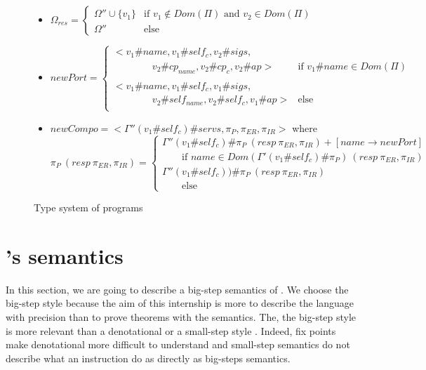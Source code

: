 \begin{figure}[ht!]
{{\begin{itemize}
\item $\Omega_{res} = \begin{cases}
\Omega'' \cup \{v_1\} & \text{if } v_1\notin Dom(\Pi)\text{ and } v_2 \in Dom(\Pi)\\
\Omega'' & \text{else}
\end{cases}
$

\item $newPort = \begin{cases}<v_1\#name,v_1\#self_c,v_2\#sigs,&\\
\qquad \qquad  v_2\#cp_{name}, v_2\#cp_c,v_2\#ap>& \text{if }v_1\#name \in Dom(\Pi)\\
\\
<v_1\#name,v_1\#self_c,v_1\#sigs,&\\
\qquad \qquad  v_2\#self_{name}, v_2\#self_c,v_1\#ap>& \text{else}\\




\end{cases} $
\item $newCompo = <\Gamma''(v_1\#self_c)\#servs,\pi_P,\pi_{ER}, \pi_{IR}>$
where \[\pi_P~(resp~\pi_{ER},\pi_{IR})= \begin{cases}
\Gamma''(v_1\#self_c)\#\pi_P~(resp~\pi_{ER},\pi_{IR}) + [name \rightarrow newPort]&\\
\qquad \text{if $name\in Dom(\Gamma'(v_1\#self_c)\#\pi_P)~(resp~\pi_{ER},\pi_{IR})$}&\\
\Gamma''(v_1\#self_c))\#\pi_P~(resp~\pi_{ER},\pi_{IR})\\ \qquad \text{else}
\end{cases}\]
\end{itemize}

}}
\caption{Type system of \compo{} programs}
\end{figure}








\chapter{\compo's semantics}
In this section, we are going to describe a big-step semantics of \compo{}. We choose the big-step style because the aim of this internship is more to describe the language with precision than to prove theorems with the semantics. The, the big-step style is more relevant than a denotational or a small-step style \cite{Cha13}. Indeed, fix points make denotational more difficult to understand and small-step semantics do not describe what an instruction do as directly as big-steps semantics.

